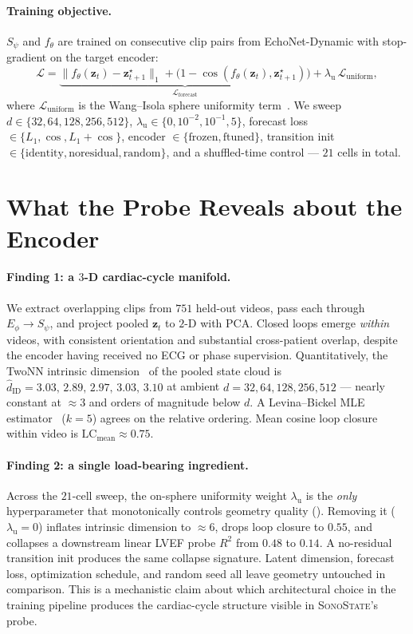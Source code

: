 \documentclass[runningheads]{llncs}
\newcommand{\sonostate}{\textsc{SonoState}\xspace}
\begin{document}
\paragraph{Training objective.}
$S_\psi$ and $f_\theta$ are trained on consecutive clip pairs from
EchoNet-Dynamic with stop-gradient on the target encoder:
\[
\mathcal{L}
= \underbrace{\bigl\lVert f_\theta(\mathbf{z}_t) - \mathbf{z}^\star_{t+1}\bigr\rVert_1
  + \bigl(1 - \cos(f_\theta(\mathbf{z}_t), \mathbf{z}^\star_{t+1})\bigr)}_{\mathcal{L}_\mathrm{forecast}}
+ \lambda_\mathrm{u}\,\mathcal{L}_\mathrm{uniform},
\]
where $\mathcal{L}_\mathrm{uniform}$ is the Wang--Isola sphere uniformity
term~\cite{wang2020uniformity}. We sweep
$d \in \{32,64,128,256,512\}$, $\lambda_\mathrm{u} \in \{0,10^{-2},10^{-1},5\}$,
forecast loss $\in \{L_1,\cos,L_1{+}\cos\}$, encoder
$\in \{\text{frozen},\text{ftuned}\}$, transition init
$\in \{\text{identity},\text{noresidual},\text{random}\}$, and a
shuffled-time control --- $21$ cells in total.

\section{What the Probe Reveals about the Encoder}

\paragraph{Finding 1: a $3$-D cardiac-cycle manifold.}
We extract overlapping clips from $751$ held-out videos, pass each through
$E_\phi \!\to\! S_\psi$, and project pooled $\mathbf{z}_t$ to $2$-D with
PCA. Closed loops emerge \emph{within} videos, with consistent orientation
and substantial cross-patient overlap, despite the encoder having received
no ECG or phase supervision. Quantitatively, the TwoNN intrinsic
dimension~\cite{facco2017twonn} of the pooled state cloud is
$\widehat{d}_\mathrm{ID} = 3.03,\,2.89,\,2.97,\,3.03,\,3.10$ at ambient
$d{=}32,64,128,256,512$ --- nearly constant at ${\approx}3$ and orders of
magnitude below $d$. A Levina--Bickel MLE
estimator~\cite{levina2004mle} ($k{=}5$) agrees on the relative ordering.
Mean cosine loop closure within video is
$\mathrm{LC}_\mathrm{mean} \approx 0.75$.

\paragraph{Finding 2: a single load-bearing ingredient.}
Across the $21$-cell sweep, the on-sphere uniformity weight
$\lambda_\mathrm{u}$ is the \emph{only} hyperparameter that monotonically
controls geometry quality (). Removing it
($\lambda_\mathrm{u}{=}0$) inflates intrinsic dimension to ${\approx}6$,
drops loop closure to $0.55$, and collapses a downstream linear LVEF probe
$R^2$ from $0.48$ to $0.14$. A no-residual transition init produces the
same collapse signature. Latent dimension, forecast loss, optimization
schedule, and random seed all leave geometry untouched in comparison.
This is a mechanistic claim about which architectural choice in the
training pipeline produces the cardiac-cycle structure visible in
\sonostate{}'s probe.
\end{document}
